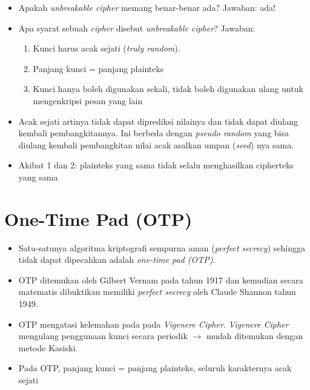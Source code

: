 \documentclass{article}
\begin{document}
\begin{itemize}
    \item Apakah \textit{unbreakable cipher} memang benar-benar ada?
    Jawaban: ada!
    \item Apa syarat sebuah \textit{cipher} disebut \textit{unbreakable cipher}?
    Jawaban:
    \begin{enumerate}
        \item Kunci harus acak sejati (\textit{truly random}).
        \item Panjang kunci = panjang plainteks
        \item Kunci hanya boleh digunakan sekali, tidak boleh digunakan ulang untuk mengenkripsi pesan yang lain
    \end{enumerate}
    \item Acak sejati artinya tidak dapat diprediksi nilainya dan tidak dapat diulang kembali pembangkitannya. Ini berbeda dengan \textit{pseudo random} yang bisa diulang kembali pembangkitan nilai acak asalkan umpan (\textit{seed}) nya sama.
    \item Akibat 1 dan 2: plainteks yang sama tidak selalu menghasilkan cipherteks yang sama
\end{itemize}

\newpage


\section*{One-Time Pad (OTP)}

\begin{itemize}
    \item Satu-satunya algoritma kriptografi sempurna aman (\textit{perfect secrecy}) sehingga tidak dapat dipecahkan adalah \textit{one-time pad (OTP)}.
    \item OTP ditemukan oleh Gilbert Vernam pada tahun 1917 dan kemudian secara matematis dibuktikan memiliki \textit{perfect secrecy} oleh Claude Shannon tahun 1949.
    \item OTP mengatasi kelemahan pada pada \textit{Vigenere Cipher}. \textit{Vigenere Cipher} mengulang penggunaan kunci secara periodik $\rightarrow$ mudah ditemukan dengan metode Kasiski.
    \item Pada OTP, panjang kunci = panjang plainteks, seluruh karakternya acak sejati
\end{itemize}

\vspace{5mm}
\end{document}
